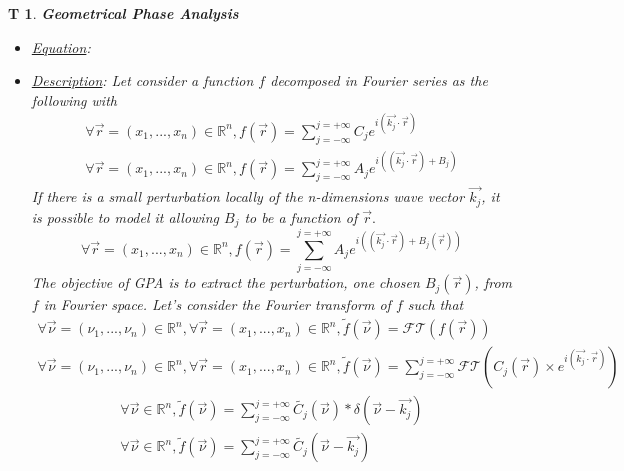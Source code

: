 \documentclass[12pt]{article}
\newtheorem{T}{T}
\begin{document}
\begin{T}
\normalfont \textbf{Geometrical Phase Analysis}
\begin{itemize}
\item \underline{Equation}: 
\item \underline{Description}: Let consider a function $f$ decomposed in Fourier series as the following with 
\begin{equation}
\begin{gathered}
\forall \vec{r}=(x_1,...,x_n) \in \mathbb{R}^n, f(\vec{r})=\sum_{j=-\infty}^{j=+\infty}C_je^{i(\vec{k_j}\cdot\vec{r})} \\
\forall \vec{r}=(x_1,...,x_n) \in \mathbb{R}^n, f(\vec{r})=\sum_{j=-\infty}^{j=+\infty}A_je^{i((\vec{k_j}\cdot\vec{r})+B_j)}
\end{gathered}
\end{equation}
If there is a small perturbation locally of the n-dimensions wave vector $\vec{k_j}$, it is possible to model it allowing $B_j$ to be a function of $\vec{r}.$ 
\begin{equation}
\forall \vec{r}=(x_1,...,x_n) \in \mathbb{R}^n, f(\vec{r})=\sum_{j=-\infty}^{j=+\infty}A_je^{i((\vec{k_j}\cdot\vec{r})+B_j(\vec{r}))}
\end{equation}
The objective of GPA is to extract the perturbation, one chosen $B_j(\vec{r})$, from $f$ in Fourier space. Let's consider the Fourier transform of $f$ such that
\begin{equation*}
\begin{gathered}
\forall \vec{\nu}=(\nu_1,...,\nu_n) \in \mathbb{R}^n, \forall \vec{r}=(x_1,...,x_n) \in \mathbb{R}^n, \widetilde{f}(\vec{\nu})=\mathcal{FT}(f(\vec{r})) \\
\forall \vec{\nu}=(\nu_1,...,\nu_n) \in \mathbb{R}^n, \forall \vec{r}=(x_1,...,x_n) \in \mathbb{R}^n, \widetilde{f}(\vec{\nu})=\sum_{j=-\infty}^{j=+\infty}\mathcal{FT}(C_j(\vec{r})\times e^{i(\vec{k_j}\cdot\vec{r})})
\end{gathered}
\end{equation*}
\begin{equation}
\begin{gathered}
\forall \vec{\nu}\in \mathbb{R}^n, \widetilde{f}(\vec{\nu})=\sum_{j=-\infty}^{j=+\infty}\widetilde{C_j}(\vec{\nu})\ast\delta(\vec{\nu}-\vec{k_j})\\
\forall \vec{\nu}\in \mathbb{R}^n, \widetilde{f}(\vec{\nu})=\sum_{j=-\infty}^{j=+\infty}\widetilde{C_j}(\vec{\nu}-\vec{k_j})
\end{gathered}
\end{equation}

\end{itemize}
\end{T}
\end{document}
